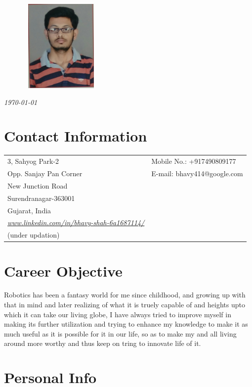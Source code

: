 \documentclass[margin,line]{res}
\begin{document}
\begin{figure}[h]
\includegraphics[width=4cm,height=4.5cm]{photo.jpg}
\end{figure}

 \hfill {\em \today}

\begin{resume}
\section{\sc \bf Contact Information}

\vspace{.05in}
\begin{tabular}{@{}p{3.5in}p{3in}}
3, Sahyog Park-2             & {Mobile No.:}  +917490809177 \\
Opp. Sanjay Pan Corner 
 & {E-mail:}  bhavy414@google.com\\
New Junction Road\\
Surendranagar-363001\\
Gujarat, India\\
\em \url {www.linkedin.com/in/bhavy-shah-6a1687114/}\\
(under updation)
\end{tabular}


\section{\sc \bf Career Objective}

Robotics has been a fantasy world for me since childhood, and growing up with that in mind and later realizing of what it is truely capable of and heights upto which it can take our living globe, I have always tried to improve myself in making its further utilization and trying to enhance my knowledge to make it as much useful as it is possible for it in our life, so as to make my and all living around more worthy and thus keep on tring to innovate life of it.

\section{\sc \bf Personal Info}


\end{resume}
\end{document}
